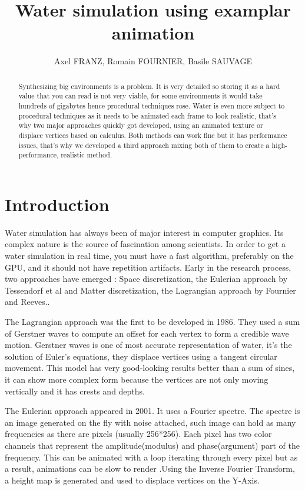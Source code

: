 \documentclass{article}
\title{Water simulation using examplar animation}
\author{Axel FRANZ, Romain FOURNIER, Basile SAUVAGE}
\begin{document}
%



\tableofcontents
\newpage

\clearpage

\begin{abstract}
Synthesizing big environments is a problem. It is very detailed so storing it as a hard value that you can read is not very viable, for some environments it would take hundreds of gigabytes hence procedural techniques rose. Water is even more subject to procedural techniques as it needs to be animated each frame to look realistic, that's why two major approaches quickly got developed, using an animated texture or displace vertices based on calculus. Both methods can work fine but it has performance issues, that's why we developed a third approach mixing both of them to create a high-performance, realistic method.
\end{abstract}

\section{Introduction}

Water simulation has always been of major interest in computer graphics. Its complex nature is the source of fascination among scientists. In order to get a water simulation in real time, you must have a fast algorithm, preferably on the GPU, and it should not have repetition artifacts. Early in the research process, two approaches have emerged : Space discretization, the Eulerian approach by Tessendorf et al\cite{tessendorf2001simulating} and Matter discretization, the Lagrangian approach by Fournier and Reeves.\cite{fournier1986simple}.


The Lagrangian approach was the first to be developed in 1986\cite{fournier1986simple}. They used a sum of Gerstner waves to compute an offset for each vertex to form a credible wave motion. Gerstner waves is one of most accurate representation of water, it's the solution of Euler's equations, they displace vertices using a tangent circular movement. This model has very good-looking results better than a sum of sines, it can show more complex form because the vertices are not only moving vertically and it has crests and depths.

The Eulerian approach appeared in 2001\cite{tessendorf2001simulating}. It uses a Fourier spectre. The spectre is an image generated on the fly with noise attached, such image can hold as many frequencies as there are pixels (usually 256*256). Each pixel has two color channels that represent the amplitude(modulus) and phase(argument) part of the frequency. This can be animated with a loop iterating through every pixel but as a result, animations can be slow to render .Using the Inverse Fourier Transform, a height map is generated and used to displace vertices on the Y-Axis.
\end{document}
